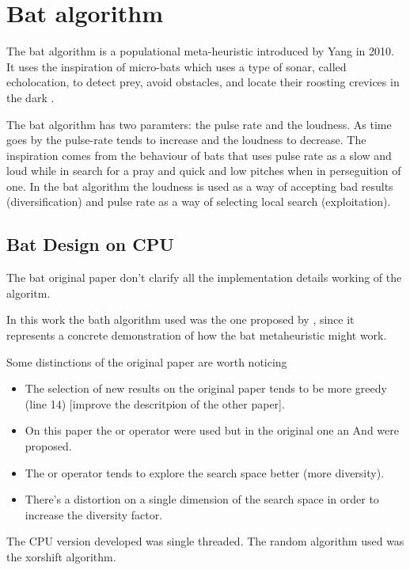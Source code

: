 \documentclass[conference]{IEEEtran}
\begin{document}

\section{Bat algorithm} \label{bat} %

The bat algorithm is a populational meta-heuristic introduced by Yang in
2010. It uses the inspiration of micro-bats which uses a type of sonar,
called echolocation, to detect prey, avoid obstacles, and locate their
roosting crevices in the dark \cite{original}.

The bat algorithm has two paramters: the pulse rate and the loudness.
As time goes by the pulse-rate tends to increase and the loudness to
decrease. The inspiration comes from the behaviour of bats that uses
pulse rate as a slow and loud while in search for a pray and quick
and low pitches when in perseguition of one. In the bat algorithm the
loudness is used as a way of accepting bad results (diversification) and
pulse rate as a way of selecting local search (exploitation).

\subsection{Bat Design on CPU}

The bat original paper don't clarify all the implementation details
working of the algoritm.

In this work the bath algorithm used was the one proposed by
\cite{comparisonBatParpinelli}, since it represents a concrete demonstration of how
the bat metaheuristic might work.

Some distinctions of the original paper are worth noticing

\begin{itemize}
    \item The selection of new results on the original paper tends to be more greedy (line 14) [improve the descritpion of the other paper].
    \item On this paper the or operator were used but in the original one an And were proposed.
    \item The or operator tends to explore the search space better (more diversity).
    \item There's a distortion on a single dimension of the search space in
order to increase the diversity factor.
\end{itemize}

The CPU version developed was single threaded. The random algorithm used
was the xorshift algorithm.
\end{document}
